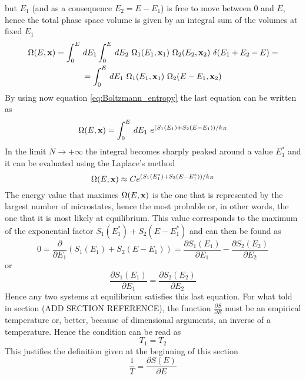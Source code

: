 but $E_1$ (and as a consequence $E_2 = E - E_1$) is free to move between $0$ and $E$, hence the total phase space volume is given by an integral sum of the volumes at fixed $E_1$ \\
\begin{gather*}
    \Omega(E, \mathbf{x}) = \int_0^E \, dE_1 \int_0^E \, dE_2 \ \Omega_1(E_1, \mathbf{x}_1) \ \Omega_2(E_2, \mathbf{x}_2) \ \delta(E_1 + E_2 - E) = \\
    = \int_0^E \, dE_1 \ \Omega_1(E_1, \mathbf{x}_1) \ \Omega_2(E - E_1, \mathbf{x}_2)
\end{gather*}
By using now equation \ref{eq:Boltzmann_entropy} the last equation can be written as 
\begin{equation*}
    \Omega(E, \mathbf{x}) = \int_0^E \, dE_1 \ e^{(S_1(E_1) + S_2(E-E_1))/k_B}
\end{equation*}
In the limit $N \to +\infty$ the integral becomes sharply peaked around a value $E_1^*$ and it can be evaluated using the Laplace's method
\begin{equation*}
    \Omega(E, \mathbf{x}) \approx C e^{(S_1(E_1^*) + S_2(E-E_1^*))/k_B}
\end{equation*}
The energy value that maximes $\Omega(E, \mathbf{x})$ is the one that is represented by the largest number of microstates, hence the most probable or, in other words, the one that it is most likely at equilibrium. This value corresponds to the maximum of the exponential factor $S_1(E_1^*) + S_2(E-E_1^*)$ and can then be found as 
\begin{equation*}
    0 = \frac{\partial}{\partial E_1}(S_1(E_1) + S_2(E-E_1)) = \frac{\partial S_1(E_1)}{\partial E_1} - \frac{\partial S_2(E_2)}{\partial E_2} 
\end{equation*}
or
\begin{equation*}
    \frac{\partial S_1(E_1)}{\partial E_1} = \frac{\partial S_2(E_2)}{\partial E_2} 
\end{equation*}
Hence any two systems at equilibrium satisfies this last equation. For what told in section (ADD SECTION REFERENCE), the function 
$\frac{\partial S}{\partial E}$ must be an empirical temperature or, better, because of dimensional arguments, an inverse of a temperature. Hence the condition can be read as 
\begin{equation*}
    T_1 = T_2
\end{equation*}
This justifies the definition given at the beginning of this section 
\begin{equation}
    \frac{1}{T} = \frac{\partial S(E)}{\partial E}
    \label{eq:absolute_temperature}
\end{equation}

